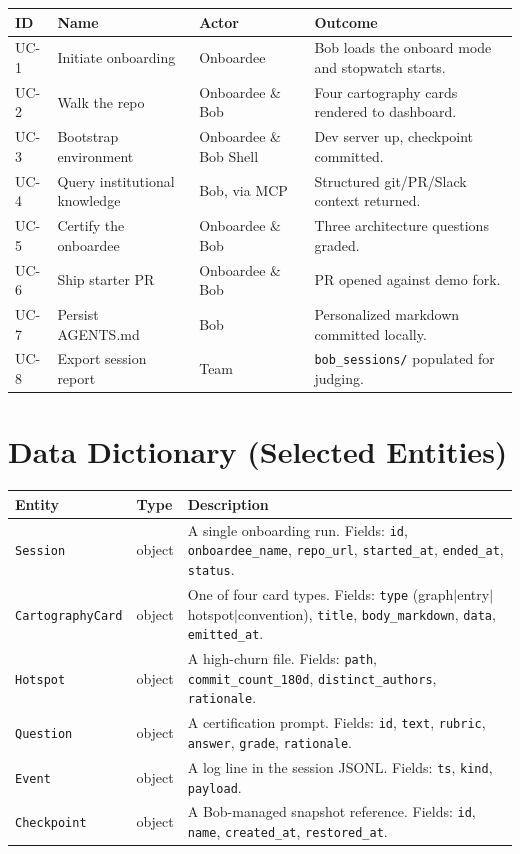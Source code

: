 \documentclass[11pt,letterpaper]{article}
\begin{document}
\begin{longtable}{|p{2.5cm}|p{3.2cm}|p{4cm}|p{4.5cm}|}
\hline
\textbf{ID} & \textbf{Name} & \textbf{Actor} & \textbf{Outcome} \\
\hline
UC-1 & Initiate onboarding & Onboardee & Bob loads the onboard mode and stopwatch starts. \\
\hline
UC-2 & Walk the repo & Onboardee \& Bob & Four cartography cards rendered to dashboard. \\
\hline
UC-3 & Bootstrap environment & Onboardee \& Bob Shell & Dev server up, checkpoint committed. \\
\hline
UC-4 & Query institutional knowledge & Bob, via MCP & Structured git/PR/Slack context returned. \\
\hline
UC-5 & Certify the onboardee & Onboardee \& Bob & Three architecture questions graded. \\
\hline
UC-6 & Ship starter PR & Onboardee \& Bob & PR opened against demo fork. \\
\hline
UC-7 & Persist AGENTS.md & Bob & Personalized markdown committed locally. \\
\hline
UC-8 & Export session report & Team & \texttt{bob\_sessions/} populated for judging. \\
\hline
\end{longtable}

\section{Data Dictionary (Selected Entities)}

\begin{longtable}{|p{3.2cm}|p{3.2cm}|p{7.6cm}|}
\hline
\textbf{Entity} & \textbf{Type} & \textbf{Description} \\
\hline
\texttt{Session} & object & A single onboarding run. Fields: \texttt{id}, \texttt{onboardee\_name}, \texttt{repo\_url}, \texttt{started\_at}, \texttt{ended\_at}, \texttt{status}. \\
\hline
\texttt{CartographyCard} & object & One of four card types. Fields: \texttt{type} (graph$|$entry$|$hotspot$|$convention), \texttt{title}, \texttt{body\_markdown}, \texttt{data}, \texttt{emitted\_at}. \\
\hline
\texttt{Hotspot} & object & A high-churn file. Fields: \texttt{path}, \texttt{commit\_count\_180d}, \texttt{distinct\_authors}, \texttt{rationale}. \\
\hline
\texttt{Question} & object & A certification prompt. Fields: \texttt{id}, \texttt{text}, \texttt{rubric}, \texttt{answer}, \texttt{grade}, \texttt{rationale}. \\
\hline
\texttt{Event} & object & A log line in the session JSONL. Fields: \texttt{ts}, \texttt{kind}, \texttt{payload}. \\
\hline
\texttt{Checkpoint} & object & A Bob-managed snapshot reference. Fields: \texttt{id}, \texttt{name}, \texttt{created\_at}, \texttt{restored\_at}. \\
\hline
\end{longtable}
\end{document}
